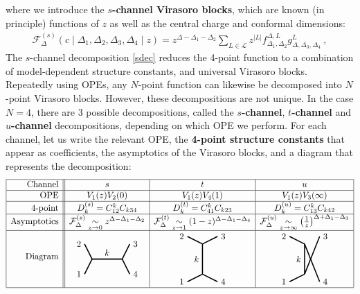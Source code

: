 \documentclass[12pt, a4paper]{article}
\theoremstyle{break}
\begin{document}
where we introduce the \textbf{$s$-channel Virasoro blocks}, which are known (in principle) functions of $z$ as well as the central charge and conformal dimensions:
\begin{align}
 \mathcal{F}_{\Delta}^{(s)}\left(c\middle|\Delta_1,\Delta_2,\Delta_3,\Delta_4\middle|z\right) = z^{\Delta-\Delta_1-\Delta_2}\sum_{L\in\mathcal{L}} z^{|L|} f_{\Delta_1,\Delta_2}^{\Delta,L}g^L_{\Delta,\Delta_3,\Delta_4}\ ,
 \label{fsl}
\end{align}
The $s$-channel decomposition \eqref{sdec} reduces the 4-point function to a combination of model-dependent structure constants, and universal Virasoro blocks. Repeatedly using OPEs, any $N$-point function can likewise be decomposed into $N$-point Virasoro blocks. However, these decompositions are not unique. In the case $N=4$, there are 3 possible decompositions, called the \textbf{$s$-channel}, \textbf{$t$-channel} and \textbf{$u$-channel} decompositions, depending on which OPE we perform. For each channel, let us write the relevant OPE, the \textbf{4-point structure constants} that appear as coefficients, the asymptotics of the Virasoro blocks, and a diagram that represents the decomposition:
\begin{align}
 \begin{array}{|r||c|c|c|}
  \hline 
  \text{Channel} & s & t & u
  \\ \hline
  \text{OPE} & V_1(z)V_2(0) & V_1(z)V_4(1) & V_1(z)V_3(\infty)
  \\ \hline 
  \text{4-point} & D^{(s)}_k = C_{12}^k C_{k34} & D^{(t)}_k = C_{41}^k C_{k23} & D^{(u)}_k = C_{13}^k C_{k42}
\\ \hline 
  \text{Asymptotics} & \mathcal{F}^{(s)}_{\Delta}\underset{z\to 0}{\sim} z^{\Delta-\Delta_1-\Delta_2} & \mathcal{F}^{(t)}_{\Delta}\underset{z\to 1}{\sim} (1-z)^{\Delta-\Delta_1-\Delta_4}
  & \mathcal{F}^{(u)}_\Delta  \underset{z\to \infty}{\sim} \left(\tfrac{1}{z}\right)^{\Delta+\Delta_1-\Delta_3}
  \\
  \hline 
\text{Diagram} & 
\begin{tikzpicture}[baseline=(current  bounding  box.center), very thick, scale = .3]
\draw (-1,2) node [left] {$2$} -- (0,0) -- node [above] {$k$} (4,0) -- (5,2) node [right] {$3$};
\draw (-1,-2) node [left] {$1$} -- (0,0);
\draw (4,0) -- (5,-2) node [right] {$4$};
\end{tikzpicture}
& 
\begin{tikzpicture}[baseline=(current  bounding  box.center), very thick, scale = .3]
 \draw (-2,3) node [left] {$2$} -- (0,2) -- node [left] {$k$} (0,-2) -- (-2, -3) node [left] {$1$};
\draw (0,2) -- (2,3) node [right] {$3$};
\draw (0,-2) -- (2, -3) node [right] {$4$};
\end{tikzpicture}
& 
\begin{tikzpicture}[baseline=(current  bounding  box.center), very thick, scale = .3]
\draw (-2,1) node [left] {$2$} -- (0,0) -- node [left] {$k$} (0,-4) ;
\draw (0,0)-- (2,-5) node [right] {$4$};
\draw (-2,-5) node [left] {$1$} -- (0,-4);
\draw (0,-4) -- (2,1) node [right] {$3$};
\end{tikzpicture} 
  \\
  \hline 
 \end{array}
 \label{stu}
\end{align}
\end{document}
